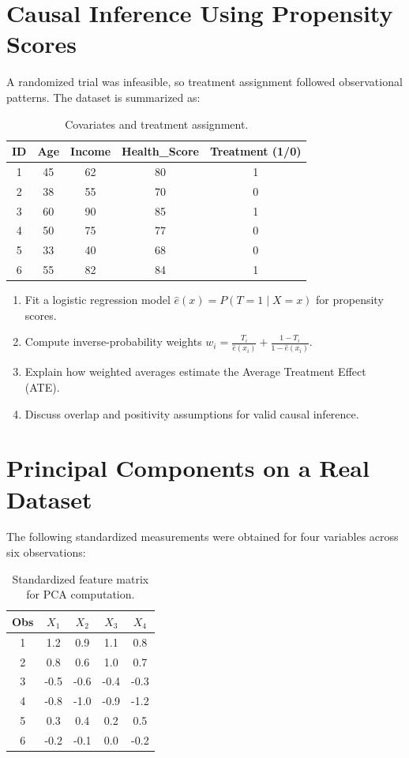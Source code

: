 \documentclass[12pt,a4paper]{article}
\begin{document}
\section{Causal Inference Using Propensity Scores}
A randomized trial was infeasible, so treatment assignment followed observational patterns.
The dataset is summarized as:

\begin{table}[H]
\centering
\begin{tabular}{c|ccc|c}
\toprule
ID & Age & Income & Health\_Score & Treatment (1/0) \\
\midrule
1 & 45 & 62 & 80 & 1 \\
2 & 38 & 55 & 70 & 0 \\
3 & 60 & 90 & 85 & 1 \\
4 & 50 & 75 & 77 & 0 \\
5 & 33 & 40 & 68 & 0 \\
6 & 55 & 82 & 84 & 1 \\
\bottomrule
\end{tabular}
\caption{Covariates and treatment assignment.}
\end{table}

\begin{enumerate}[label=(\arabic*)]
\item Fit a logistic regression model \( \hat{e}(x) = P(T=1\mid X=x) \) for propensity scores.
\item Compute inverse-probability weights \( w_i = \frac{T_i}{\hat{e}(x_i)} + \frac{1-T_i}{1-\hat{e}(x_i)} \).
\item Explain how weighted averages estimate the Average Treatment Effect (ATE).
\item Discuss overlap and positivity assumptions for valid causal inference.
\end{enumerate}


\section{Principal Components on a Real Dataset}
The following standardized measurements were obtained for four variables across six observations:

\begin{table}[H]
\centering
\begin{tabular}{c|cccc}
\toprule
Obs & $X_1$ & $X_2$ & $X_3$ & $X_4$ \\
\midrule
1 & 1.2 & 0.9 & 1.1 & 0.8 \\
2 & 0.8 & 0.6 & 1.0 & 0.7 \\
3 & -0.5 & -0.6 & -0.4 & -0.3 \\
4 & -0.8 & -1.0 & -0.9 & -1.2 \\
5 & 0.3 & 0.4 & 0.2 & 0.5 \\
6 & -0.2 & -0.1 & 0.0 & -0.2 \\
\bottomrule
\end{tabular}
\caption{Standardized feature matrix for PCA computation.}
\end{table}
\end{document}
